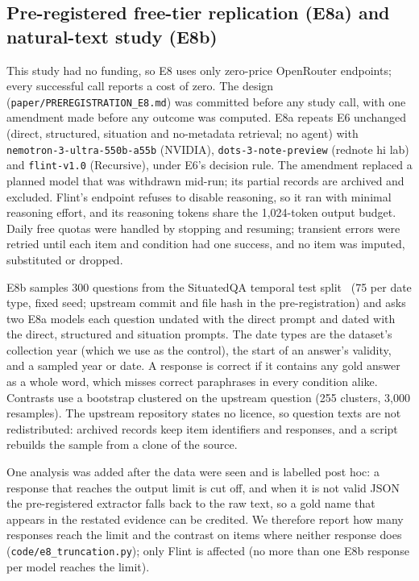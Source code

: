 \subsection*{Pre-registered free-tier replication (E8a) and natural-text study (E8b)}

This study had no funding, so E8 uses only zero-price OpenRouter endpoints;
every successful call reports a cost of zero. The design
(\texttt{paper/PREREGISTRATION\_E8.md}) was committed before any study call,
with one amendment made before any outcome was computed. E8a repeats E6
unchanged (direct, structured, situation and no-metadata retrieval; no agent)
with \texttt{nemotron-3-ultra-550b-a55b} (NVIDIA),
\texttt{dots-3-note-preview} (rednote hi lab) and \texttt{flint-v1.0}
(Recursive), under E6's decision rule. The amendment replaced a planned model
that was withdrawn mid-run; its partial records are archived and excluded.
Flint's endpoint refuses to disable reasoning, so it ran with minimal reasoning
effort, and its reasoning tokens share the 1,024-token output budget. Daily
free quotas were handled by stopping and resuming; transient errors were retried
until each item and condition had one success, and no item was imputed,
substituted or dropped.

E8b samples 300 questions from the SituatedQA temporal test
split~\cite{zhang2021situatedqa} (75 per date type, fixed seed; upstream commit
and file hash in the pre-registration) and asks two E8a models each question
undated with the direct prompt and dated with the direct, structured and
situation prompts. The date types are the dataset's collection year (which we
use as the control), the start of an answer's validity, and a sampled year or
date. A response is correct if it contains any gold answer as a whole word, which misses correct paraphrases in every condition alike.
Contrasts use a bootstrap clustered on the upstream question (255 clusters,
3,000 resamples). The upstream repository states no licence, so question texts
are not redistributed: archived records keep item identifiers and responses,
and a script rebuilds the sample from a clone of the source.

One analysis was added after the data were seen and is labelled post hoc: a
response that reaches the output limit is cut off, and when it is not valid
JSON the pre-registered extractor falls back to the raw text, so a gold name
that appears in the restated evidence can be credited. We therefore report how
many responses reach the limit and the contrast on items where neither
response does (\texttt{code/e8\_truncation.py}); only Flint is affected
(no more than one E8b response per model reaches the limit).

